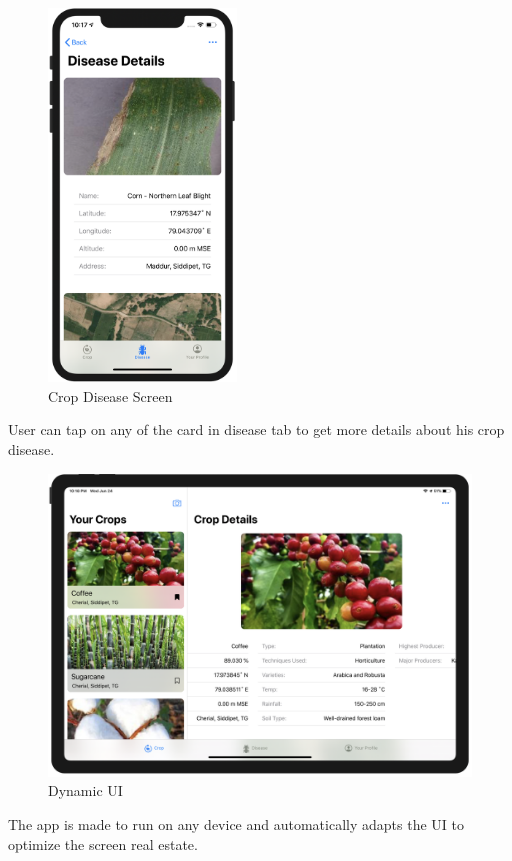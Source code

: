 \documentclass[../Report.tex]{subfiles}
\begin{document}
\begin{figure}[H]
    \centering
    \includegraphics[width=5cm]{images/disease_details.png}
    \caption{Crop Disease Screen}
    \label{fig:ss_disease_details}
\end{figure}

User can tap on any of the card in disease tab to get more details about his crop disease.

\begin{figure}[H]
    \centering
    \includegraphics[width=0.75\linewidth]{images/ipad.png}
    \caption{Dynamic UI}
    \label{fig:ss_ipad}
\end{figure}

The app is made to run on any device and automatically adapts the UI to optimize the screen real estate.
\end{document}
